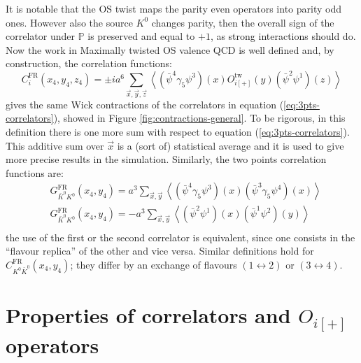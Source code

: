 \documentclass[english, LaM, oneside, noexaminfo]{sapthesis}
\newcommand{\la}{\langle}
\newcommand{\ra}{\rangle}
\begin{document}
It is notable that the OS twist maps the parity even operators into parity odd ones.
However also the source $K^{0}$ changes parity, then the overall sign of the correlator under $\mathbb{P}$ is preserved and equal to $+1$, as strong interactions should do.
Now the work in Maximally twisted OS valence QCD is well defined and, by construction, the correlation functions:
\begin{equation}\label{eq:lattice-correlators}
    C_i^\text{FR}(x_4,y_4,z_4) = \pm i a^6 \sum_{\vec x, \vec y, \vec z}\left\la \left(\bar\psi^4 \gamma_5 \psi^3 \right) (x) O_{i[+]}^\text{tw} (y) \left(\bar\psi^2 \psi^1 \right) (z)\right\ra
\end{equation}
gives the same Wick contractions of the correlators in equation (\ref{eq:3pts-correlators}), showed in Figure \ref{fig:contractions-general}.
To be rigorous, in this definition there is one more sum with respect to equation (\ref{eq:3pts-correlators}).
This additive sum over $\vec x$ is a (sort of) statistical average and it is used to give more precise results in the simulation.
Similarly, the two points correlation functions are:
\begin{equation}\label{eq:lattice-propagators}
    \begin{split}
        & G_{\bar K^0 K^0}^\text{FR}(x_4,y_4) = a^3 \sum_{\vec x, \vec y} \left\la \left(\bar\psi^4 \gamma_5 \psi^3 \right) (x) \left(\bar\psi^3 \gamma_5 \psi^4 \right) (x) \right\ra \\
        & G_{\bar K^0 K^0}^\text{FR}(x_4,y_4) = - a^3 \sum_{\vec x, \vec y} \left\la \left(\bar\psi^2 \psi^1 \right) (x) \left(\bar\psi^1 \psi^2 \right) (y) \right\ra \\
    \end{split}
\end{equation}
the use of the first or the second correlator is equivalent, since one consists in the ``flavour replica'' of the other and vice versa.
Similar definitions hold for $C_{K^0 \bar K^0 }^\text{FR}(x_4,y_4)$; they differ by an exchange of flavours $(1\leftrightarrow 2)$ or $(3\leftrightarrow 4)$.


\section{Properties of correlators and $O_{i[+]}$ operators}\label{sec:operators-properties}
\end{document}
